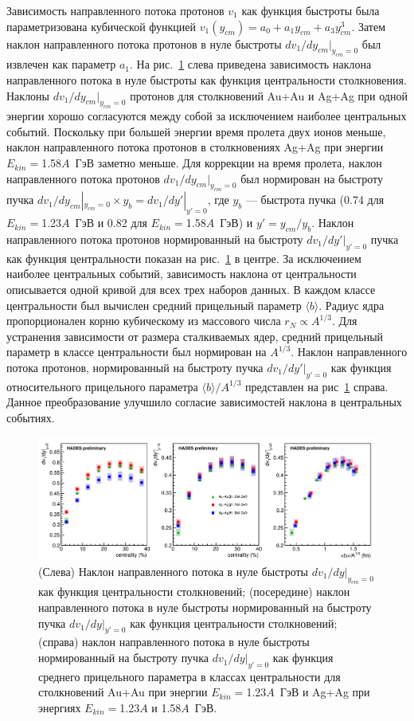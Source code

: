 Зависимость направленного потока протонов $v_1$ как функция быстроты была параметризована кубической функцией $v_1(y_{cm}) = a_0 + a_1 y_{cm} + a_3 y_{cm}^3$. 
Затем наклон направленного потока протонов в нуле быстроты $dv_1/dy_{cm}|_{y_{cm}=0}$ был извлечен как параметр $a_1$.
На рис.~\ref{fig:hades_dv1dy_many_plot} слева приведена зависимость наклона направленного потока в нуле быстроты как функция центральности столкновения.
Наклоны $dv_1/dy_{cm}|_{y_{cm}=0}$ протонов для столкновений Au+Au и Ag+Ag при одной энергии хорошо согласуются между собой за исключением наиболее центральных событий. 
Поскольку при большей энергии время пролета двух ионов меньше, наклон направленного потока протонов в столкновениях Ag+Ag при энергии $E_{kin}=$1.58$A$~ГэВ заметно меньше.
Для коррекции на время пролета, наклон направленного потока протонов $dv_1/dy_{cm}|_{y_{cm}=0}$ был нормирован на быстроту пучка $dv_1/dy_{cm}|_{y_{cm}=0} \times y_{b} = dv_1/dy'|_{y'=0}$, где $y_{b}$ --- быстрота пучка (0.74 для $E_{kin}=$1.23$A$~ГэВ и 0.82 для  $E_{kin}=$1.58$A$~ГэВ) и $y'=y_{cm}/y_b$.
Наклон направленного потока протонов нормированный на быстроту $dv_1/dy'|_{y'=0}$ пучка как функция центральности показан на рис.~\ref{fig:hades_dv1dy_many_plot} в центре. 
За исключением наиболее центральных событий, зависимость наклона от центральности описывается одной кривой для всех трех наборов данных.
В каждом классе центральности был вычислен средний прицельный параметр $\langle b \rangle$. 
Радиус ядра пропорционален корню кубическому из массового числа $r_N \propto A^{1/3}$.
Для устранения зависимости от размера сталкиваемых ядер, средний прицельный параметр в классе центральности был нормирован на $A^{1/3}$.
Наклон направленного потока протонов, нормированный на быстроту пучка $dv_1/dy'|_{y'=0}$ как функция относительного прицельного параметра  $ \langle b \rangle / A^{1/3}$ представлен на рис~\ref{fig:hades_dv1dy_many_plot} справа.
Данное преобразование улучшило согласие зависимостей наклона в центральных событиях. 
%
\begin{figure}[ht]
\begin{center}
\includegraphics[width=0.9\linewidth]{images/dv1dy_many_plot.png}
\caption{ 
(Слева) Наклон направленного потока в нуле быстроты $dv_1/dy|_{y_{cm}=0}$ как функция центральности столкновений;
(посередине) наклон направленного потока в нуле быстроты нормированный на быстроту пучка $dv_1/dy|_{y'=0}$ как функция центральности столкновений;
(справа) наклон направленного потока в нуле быстроты нормированный на быстроту пучка $dv_1/dy|_{y'=0}$ как функция среднего прицельного параметра в классах центральности
для столкновений Au+Au при энергии $E_{kin}=$1.23$A$~ГэВ и Ag+Ag при энергиях $E_{kin}=$1.23$A$ и 1.58$A$~ГэВ. }
\label{fig:hades_dv1dy_many_plot}
\end{center}
\end{figure}

